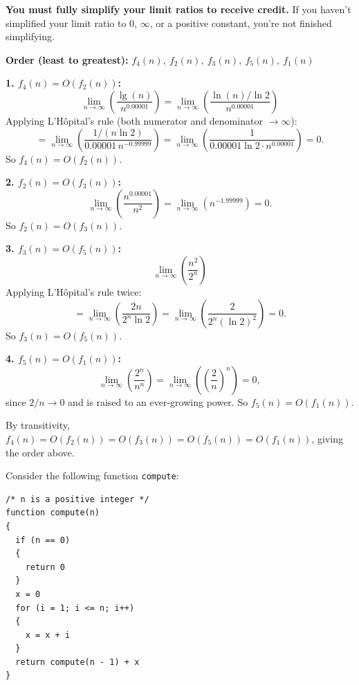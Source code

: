 \documentclass[answers,addpoints,11pt]{exam}
\newcommand{\limn}[1]{ \lim_{n \rightarrow \infty} \left( #1 \right) }
\begin{document}
\begin{questions}
\textbf{You must fully simplify your limit ratios to receive credit.} If you haven't simplified your limit ratio to 0, $\infty$, or a positive constant, you're not finished simplifying.


\begin{solution}
\textbf{Order (least to greatest):} $f_4(n),\ f_2(n),\ f_3(n),\ f_5(n),\ f_1(n)$

\medskip
\textbf{1. $f_4(n) = O(f_2(n))$:}
\[
\limn{ \frac{\lg(n)}{n^{0.00001}} } = \limn{ \frac{\ln(n)/\ln 2}{n^{0.00001}} }
\]
Applying L'H\^opital's rule (both numerator and denominator $\to \infty$):
\[
= \limn{ \frac{1/(n\ln 2)}{0.00001\, n^{-0.99999}} } = \limn{ \frac{1}{0.00001 \ln 2 \cdot n^{0.00001}} } = 0.
\]
So $f_4(n) = O(f_2(n))$.

\medskip
\textbf{2. $f_2(n) = O(f_3(n))$:}
\[
\limn{ \frac{n^{0.00001}}{n^2} } = \limn{ n^{-1.99999} } = 0.
\]
So $f_2(n) = O(f_3(n))$.

\medskip
\textbf{3. $f_3(n) = O(f_5(n))$:}
\[
\limn{ \frac{n^2}{2^n} }
\]
Applying L'H\^opital's rule twice:
\[
= \limn{ \frac{2n}{2^n \ln 2} } = \limn{ \frac{2}{2^n (\ln 2)^2} } = 0.
\]
So $f_3(n) = O(f_5(n))$.

\medskip
\textbf{4. $f_5(n) = O(f_1(n))$:}
\[
\limn{ \frac{2^n}{n^n} } = \limn{ \left(\frac{2}{n}\right)^n } = 0,
\]
since $2/n \to 0$ and is raised to an ever-growing power. So $f_5(n) = O(f_1(n))$.

\medskip
By transitivity, $f_4(n) = O(f_2(n)) = O(f_3(n)) = O(f_5(n)) = O(f_1(n))$, giving the order above.
\end{solution}

\question
Consider the following function \texttt{compute}:

\begin{lstlisting}
/* n is a positive integer */
function compute(n)
{
  if (n == 0)
  {
    return 0
  }
  x = 0
  for (i = 1; i <= n; i++)
  {
    x = x + i
  }
  return compute(n - 1) + x
}
\end{lstlisting}

\end{questions}
\end{document}
